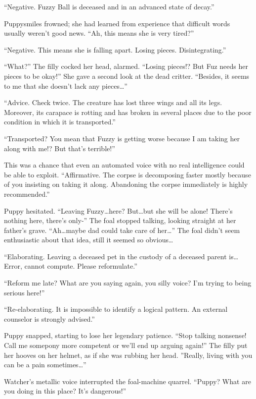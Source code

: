 ``{\mt Negative. Fuzzy Ball is deceased and in an advanced state of decay.}''

Puppysmiles frowned; she had learned from experience that difficult words usually weren't good news. ``Ah, this means she is very tired?''

``{\mt Negative. This means she is falling apart. Losing pieces. Disintegrating.}''

``What?'' The filly cocked her head, alarmed. ``Losing pieces!? But Fuz needs her pieces to be okay!'' She gave a second look at the dead critter. ``Besides, it seems to me that she doesn't lack any pieces\dots''

``{\mt Advice. Check twice. The creature has lost three wings and all its legs. Moreover, its carapace is rotting and has broken in several places due to the poor condition in which it is transported.}''

``Transported? You mean that Fuzzy is getting worse because I am taking her along with me!? But that's terrible!''

This was a chance that even an automated voice with no real intelligence could be able to exploit. ``{\mt Affirmative. The corpse is decomposing faster mostly because of you insisting on taking it along. Abandoning the corpse immediately is highly recommended.}''

Puppy hesitated. ``Leaving Fuzzy\dots here? But\dots but she will be alone! There's nothing here, there's only-'' The foal stopped talking, looking straight at her father's grave. ``Ah\dots maybe dad could take care of her\dots'' The foal didn't seem enthusiastic about that idea, still it seemed so obvious\dots

``{\mt Elaborating. Leaving a deceased pet in the custody of a deceased parent is\dots Error, cannot compute. Please reformulate.}''

``Reform me late? What are you saying again, you silly voice? I'm trying to being serious here!''

``{\mt Re-elaborating. It is impossible to identify a logical pattern. An external counselor is strongly advised.}''

Puppy snapped, starting to lose her legendary patience. ``Stop talking nonsense! Call me somepony more competent or we'll end up arguing again!'' The filly put her hooves on her helmet, as if she was rubbing her head. ''Really, living with you can be a pain sometimes\dots''

Watcher's metallic voice interrupted the foal-machine quarrel. ``Puppy? What are you doing in this place? It's dangerous!''

